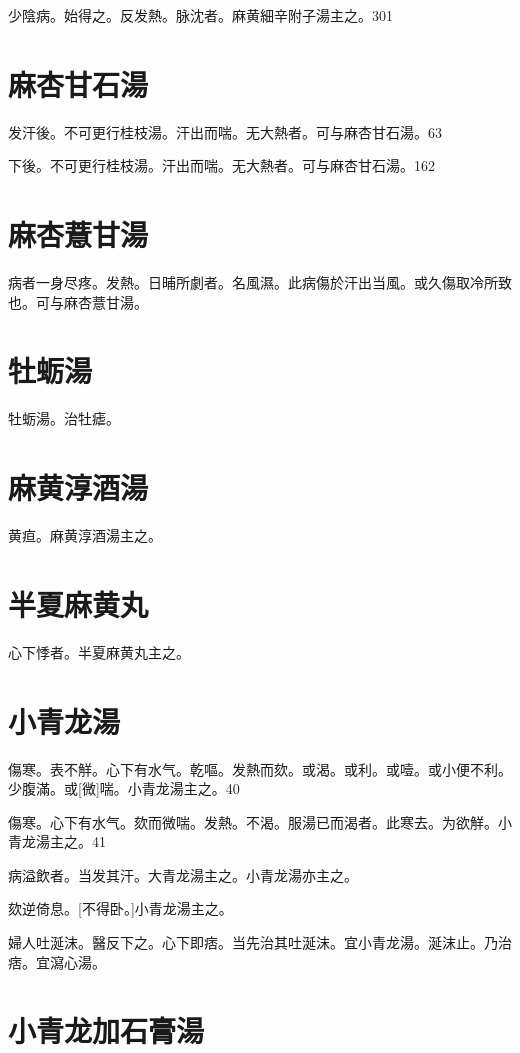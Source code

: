 \documentclass[12pt,twoside,UTF8,b5paper]{ctexbook}
\begin{document}
少陰病。始得之。反发熱。脉沈者。麻黄細辛附子湯主之。301

\section{麻杏甘石湯}

发汗後。不可更行桂枝湯。汗出而喘。无大熱者。可与麻杏甘石湯。63

下後。不可更行桂枝湯。汗出而喘。无大熱者。可与麻杏甘石湯。162

\section{麻杏薏甘湯}

病者一身尽疼。发熱。日晡所劇者。名風濕。此病傷於汗出当風。或久傷取冷所致也。可与麻杏薏甘湯。

\section{牡蛎湯}

牡蛎湯。治牡瘧。

\section{麻黄淳酒湯}

黄疸。麻黄淳酒湯主之。

\section{半夏麻黄丸}

心下悸者。半夏麻黄丸主之。

\section{小青龙湯}

傷寒。表不觧。心下有水气。乾嘔。发熱而欬。或渴。或利。或噎。或小便不利。少腹滿。或[微]喘。小青龙湯主之。40

傷寒。心下有水气。欬而微喘。发熱。不渴。服湯已而渴者。此寒去。为欲觧。小青龙湯主之。41

病溢飲者。当发其汗。大青龙湯主之。小青龙湯亦主之。

欬逆倚息。[不得卧。]小青龙湯主之。

婦人吐涎沫。醫反下之。心下即痞。当先治其吐涎沫。宜小青龙湯。涎沫止。乃治痞。宜瀉心湯。

\section{小青龙加石膏湯}
\end{document}
